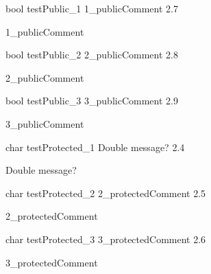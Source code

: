 \documentclass{article}
\begin{document}
\begin{cxxclass}
\begin{cxxdoc}
\end{cxxdoc}
\begin{cxxvariable}
{bool}
        {testPublic\_1}
        {}
        {1\_publicComment}
        {2.7}
\begin{cxxdoc}
1\_publicComment
\end{cxxdoc}
\end{cxxvariable}
\begin{cxxvariable}
{bool}
        {testPublic\_2}
        {}
        {2\_publicComment}
        {2.8}
\begin{cxxdoc}
2\_publicComment
\end{cxxdoc}
\end{cxxvariable}
\begin{cxxvariable}
{bool}
        {testPublic\_3}
        {}
        {3\_publicComment}
        {2.9}
\begin{cxxdoc}
3\_publicComment
\end{cxxdoc}
\end{cxxvariable}
\begin{cxxvariable}
{char}
        {testProtected\_1}
        {}
        {Double message?}
        {2.4}
\begin{cxxdoc}
Double message?
\end{cxxdoc}
\end{cxxvariable}
\begin{cxxvariable}
{char}
        {testProtected\_2}
        {}
        {2\_protectedComment}
        {2.5}
\begin{cxxdoc}
2\_protectedComment
\end{cxxdoc}
\end{cxxvariable}
\begin{cxxvariable}
{char}
        {testProtected\_3}
        {}
        {3\_protectedComment}
        {2.6}
\begin{cxxdoc}
3\_protectedComment
\end{cxxdoc}
\end{cxxvariable}
\end{cxxclass}
\begin{cxxClassGraph}
\label{cxx.}
\strut\\[5pt]\goodbreak
{}
\end{cxxClassGraph}
\end{document}
